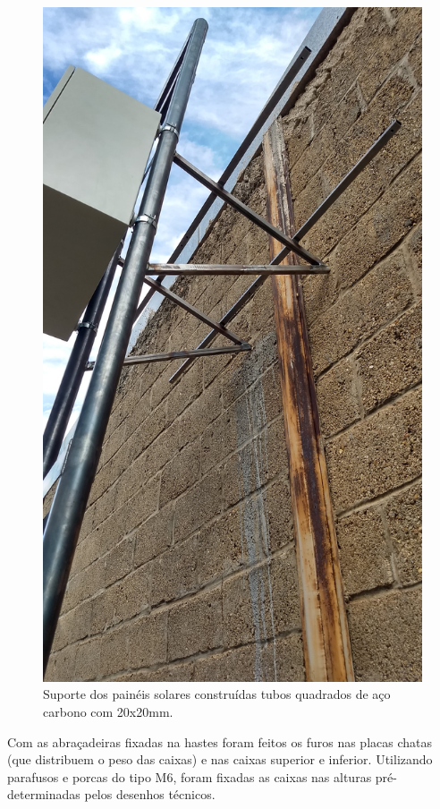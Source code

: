 \begin{figure}[H]
	\centering
    \includegraphics[keepaspectratio=true,scale=0.12]{figuras/suportepainel2.jpg}
    \caption{Suporte dos painéis solares construídas tubos quadrados de aço carbono com 20x20mm.}
    \label{supaisolcons}
\end{figure}

Com as abraçadeiras fixadas na hastes foram feitos os furos nas placas chatas (que distribuem o peso das caixas) e nas caixas superior e inferior. Utilizando parafusos e porcas do tipo M6, foram fixadas as caixas nas alturas pré-determinadas pelos desenhos técnicos. 

